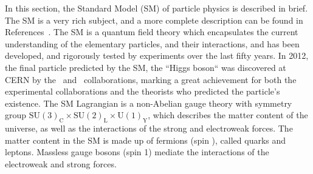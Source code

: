 In this section, the Standard Model (SM) of particle physics is described in
brief.
The SM is a very rich subject, and a more complete description can be found in
References~\cite{Agashe:2014kda,opac-b1131978,halzen1984quarks}.
The SM is a quantum field theory which encapsulates the current understanding
of the elementary particles, and their interactions, and has been developed,
and rigorously tested by experiments over the last fifty years.
In 2012, the final particle predicted by the SM, the ``Higgs boson`` was
discovered at CERN by the \atlas\ and \cms\ collaborations, marking a great
achievement for both the experimental collaborations and the theorists
who predicted the particle's existence.
The SM Lagrangian is a non-Abelian gauge theory with symmetry group 
$\mathrm{SU}(3)_\mathrm{C} \times
\mathrm{SU}(2)_\mathrm{L} \times
\mathrm{U}(1)_\mathrm{Y}$,
which describes the matter content of the universe, as well as the interactions
of the strong and electroweak forces.
The matter content in the SM is made up of fermions (spin ),
called quarks and leptons.
Massless gauge bosons (spin 1) mediate the interactions of the electroweak and
strong forces.

\begin{figure}[th]
\end{figure}

